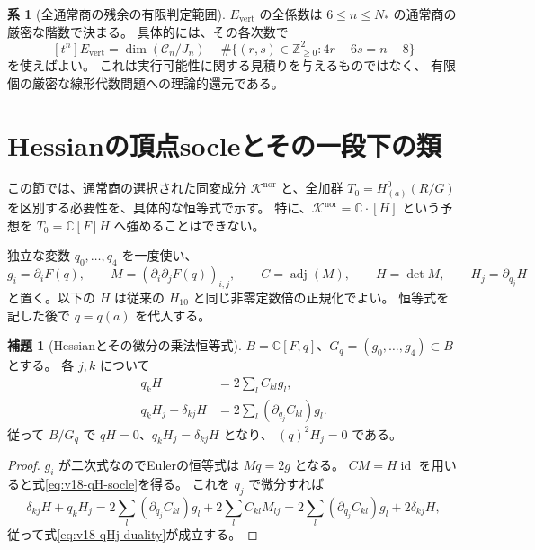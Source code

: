 \documentclass[a4paper,11pt]{ltjsarticle}
\theoremstyle{definition}
\newtheorem{lemma}[theorem]{補題}
\newtheorem{corollary}[theorem]{系}
\newcommand{\CC}{\mathbb C}
\begin{document}
\begin{corollary}[全通常商の残余の有限判定範囲]
\label{cor:v18-Evert-finite-decision}
$E_{\mathrm{vert}}$ の全係数は $6\le n\le N_*$ の通常商の厳密な階数で決まる。
具体的には、その各次数で
\[
 [t^n]E_{\mathrm{vert}}
 =\dim(\mathcal C_n/J_n)
 -\#\{(r,s)\in\mathbb Z_{\ge0}^2:4r+6s=n-8\}
\]
を使えばよい。
これは実行可能性に関する見積りを与えるものではなく、
有限個の厳密な線形代数問題への理論的還元である。
\end{corollary}





\section{Hessianの頂点socleとその一段下の類}
\label{sec:v18-vertex-hessian-chain}

この節では、通常商の選択された同変成分
$\mathcal K^{\mathrm{nor}}$ と、全加群
$T_0=H^0_{(a)}(R/G)$ を区別する必要性を、具体的な恒等式で示す。
特に、$\mathcal K^{\mathrm{nor}}=\CC\cdot[H]$ という予想を
$T_0=\CC[F]H$ へ強めることはできない。

独立な変数 $q_0,\ldots,q_4$ を一度使い、
\[
 g_i=\partial_iF(q),\qquad M=(\partial_i\partial_jF(q))_{i,j},
 \qquad C=\operatorname{adj}(M),\qquad H=\det M,
 \qquad H_j=\partial_{q_j}H
\]
と置く。以下の $H$ は従来の $H_{10}$ と同じ非零定数倍の正規化でよい。
恒等式を記した後で $q=q(a)$ を代入する。

\begin{lemma}[Hessianとその微分の乗法恒等式]
\label{lem:v18-hessian-derivative-identity}
$B=\CC[F,q]$、$G_q=(g_0,\ldots,g_4)\subset B$ とする。
各 $j,k$ について
\begin{align}
 q_kH&=2\sum_l C_{kl}g_l,
 \label{eq:v18-qH-socle}\\
 q_kH_j-\delta_{kj}H
 &=2\sum_l (\partial_{q_j}C_{kl})g_l.
 \label{eq:v18-qHj-duality}
\end{align}
従って $B/G_q$ で $qH=0$、$q_kH_j=\delta_{kj}H$ となり、
$(q)^2H_j=0$ である。
\end{lemma}

\begin{proof}
$g_i$ が二次式なのでEulerの恒等式は $Mq=2g$ となる。
$CM=H\operatorname{id}$ を用いると式\eqref{eq:v18-qH-socle}を得る。
これを $q_j$ で微分すれば
\[
 \delta_{kj}H+q_kH_j
 =2\sum_l(\partial_{q_j}C_{kl})g_l
   +2\sum_l C_{kl}M_{lj}
 =2\sum_l(\partial_{q_j}C_{kl})g_l+2\delta_{kj}H,
\]
従って式\eqref{eq:v18-qHj-duality}が成立する。
\end{proof}
\end{document}
